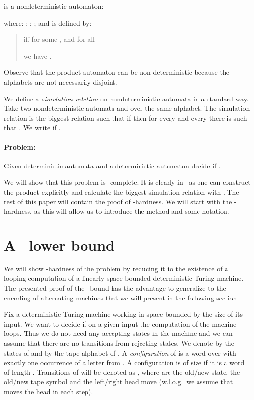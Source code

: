 \documentclass{LMCS}
\theoremstyle{plain}\newtheorem{remark}{Remark}
\theoremstyle{plain}\newtheorem{lemma}[thm]{Lemma}
\begin{document}
 is a nondeterministic automaton:

where: ; ; 
; and  is defined by:
\begin{quote}
   iff for some ,  and for all 
   
  we have .
\end{quote}

Observe that the product automaton can be non deterministic because the alphabets  are not necessarily disjoint.

We define a \emph{simulation relation} on nondeterministic automata in
a standard way. Take two nondeterministic automata
 and
 over the same
alphabet. The simulation relation  is the
biggest relation such that if  then for every 
and every  there is  such that
. We write  if .

\paragraph{Problem:} Given  deterministic automata
 and a deterministic automaton  decide if
.

We will show that this problem is \EXPTIME-complete. It is clearly in
\EXPTIME\ as one can construct the product 
explicitly and calculate the biggest simulation relation with
. The rest of this paper will contain the proof of
\EXPTIME-hardness. We will start with the \PSPACE-hardness, as this will
allow us to introduce the method and some notation.

\section{A \PSPACE\  lower bound}

We will show \PSPACE-hardness of the problem by reducing it
to the  existence of a looping computation of a linearly space bounded
deterministic Turing machine. The presented proof of the \PSPACE\ bound 
has the advantage to generalize to the encoding of
alternating machines that we will present in the following section. 

Fix a deterministic Turing machine  working in space bounded by the
size of its input. We want to decide if on a given input the
computation of the machine loops. Thus we do not need any accepting
states in the machine and we can assume that there are no transitions
from rejecting states. We denote by  the states of  and by 
the tape alphabet of . A \emph{configuration} of  is a word over
 with exactly one occurrence of a letter from
. A configuration is of size   if it is a word of
length . Transitions of  will be denoted as ,
where  are the old/new state,  the old/new tape symbol and
 the left/right head move (w.l.o.g.~we assume that 
moves the head in each step). 
\end{document}
